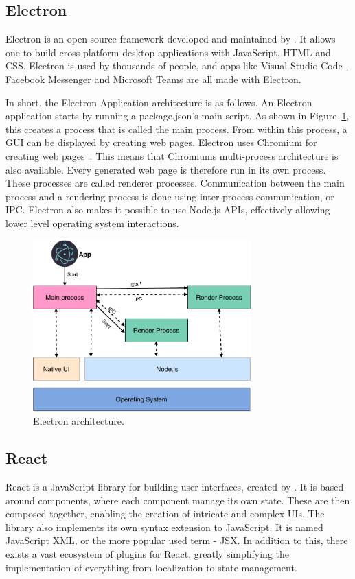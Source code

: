 \subsection{Electron}
\label{sec:theory-electron}
Electron \cite{electron} is an open-source framework developed and maintained by \citet{github}. It allows one to build cross-platform desktop applications with JavaScript, HTML and CSS. Electron is used by thousands of people, and apps like Visual Studio Code \cite{visual-studio-code}, Facebook Messenger \cite{messenger} and Microsoft Teams \cite{teams} are all made with Electron. 

In short, the Electron Application architecture is as follows. An Electron application starts by running a package.json's main script. As shown in Figure~\ref{fig:electron-processes}, this creates a process that is called the main process. From within this process, a GUI can be displayed by creating web pages. Electron uses Chromium for creating web pages~\citet{chromium}. This means that Chromiums multi-process architecture is also available. Every generated web page is therefore run in its own process. These processes are called renderer processes. Communication between the main process and a rendering process is done using inter-process communication, or IPC. Electron also makes it possible to use Node.js APIs, effectively allowing lower level operating system interactions.
\begin{figure}[ht]
    \centering
    \includegraphics[width=0.75\textwidth]{sections/theory/figures/electron-processes.pdf}
    \caption{Electron architecture.}
    \label{fig:electron-processes}
\end{figure}

\subsection{React}
React \cite{react} is a JavaScript library for building user interfaces, created by \citet{facebook}. It is based around components, where each component manage its own state. These are then composed together, enabling the creation of intricate and complex UIs. The library also implements its own syntax extension to JavaScript. It is named JavaScript XML, or the more popular used term - JSX. In addition to this, there exists a vast ecosystem of plugins for React, greatly simplifying the implementation of everything from localization to state management.

